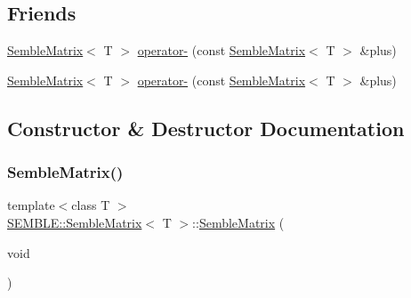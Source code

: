 \subsection*{Friends}
\begin{DoxyCompactItemize}
\item 
\mbox{\hyperlink{structSEMBLE_1_1SembleMatrix}{Semble\+Matrix}}$<$ T $>$ \mbox{\hyperlink{structSEMBLE_1_1SembleMatrix_a821dd2813fe3a716f33e5498a31745b9}{operator-\/}} (const \mbox{\hyperlink{structSEMBLE_1_1SembleMatrix}{Semble\+Matrix}}$<$ T $>$ \&plus)
\item 
\mbox{\hyperlink{structSEMBLE_1_1SembleMatrix}{Semble\+Matrix}}$<$ T $>$ \mbox{\hyperlink{structSEMBLE_1_1SembleMatrix_a821dd2813fe3a716f33e5498a31745b9}{operator-\/}} (const \mbox{\hyperlink{structSEMBLE_1_1SembleMatrix}{Semble\+Matrix}}$<$ T $>$ \&plus)
\end{DoxyCompactItemize}


\subsection{Constructor \& Destructor Documentation}
\mbox{\label{structSEMBLE_1_1SembleMatrix_a870fcbb89e1fd8f5ad2404edc58b53d6}} 
\subsubsection{\texorpdfstring{SembleMatrix()}{SembleMatrix()}\hspace{0.1cm}{\footnotesize\ttfamily [1/8]}}
{\footnotesize\ttfamily template$<$class T $>$ \\
\mbox{\hyperlink{structSEMBLE_1_1SembleMatrix}{S\+E\+M\+B\+L\+E\+::\+Semble\+Matrix}}$<$ T $>$\+::\mbox{\hyperlink{structSEMBLE_1_1SembleMatrix}{Semble\+Matrix}} (\begin{DoxyParamCaption}\item[{void}]{ }\end{DoxyParamCaption})}

\mbox{\label{structSEMBLE_1_1SembleMatrix_afaf672b694d5af975145b48ede17dfe5}} 

